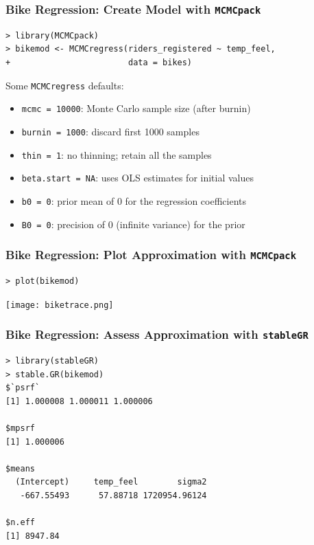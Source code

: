 \documentclass{beamer}
\begin{document}
\begin{frame}[fragile]
 \frametitle{ Bike Regression: Create Model with \texttt{MCMCpack}    }

\begin{verbatim}
> library(MCMCpack)
> bikemod <- MCMCregress(riders_registered ~ temp_feel, 
+                        data = bikes)
 \end{verbatim}
\vspace{-.3cm}
Some \texttt{MCMCregress} defaults:
\begin{itemize}
\item \texttt{mcmc = 10000}: Monte Carlo sample size (after burnin)
\item \texttt{burnin = 1000}: discard first 1000 samples
\item \texttt{thin = 1}: no thinning; retain all the samples  
\item \texttt{beta.start = NA}: uses OLS estimates for initial values
\item \texttt{b0 = 0}: prior mean of 0 for the regression coefficients
\item \texttt{B0 = 0}: precision of 0 (infinite variance) for the prior 
\end{itemize}
\end{frame}




\begin{frame}[fragile]
 \frametitle{ Bike Regression: Plot Approximation with \texttt{MCMCpack}    }
\begin{verbatim}
> plot(bikemod)
\end{verbatim}
\texttt{[image: biketrace.png]}


\end{frame}

\begin{frame}[fragile]
 \frametitle{ Bike Regression: Assess Approximation with \texttt{stableGR}    }
\begin{verbatim}
> library(stableGR)
> stable.GR(bikemod)
$`psrf`
[1] 1.000008 1.000011 1.000006

$mpsrf
[1] 1.000006

$means
  (Intercept)     temp_feel        sigma2 
   -667.55493      57.88718 1720954.96124 

$n.eff
[1] 8947.84
\end{verbatim}

\end{frame}
\end{document}
